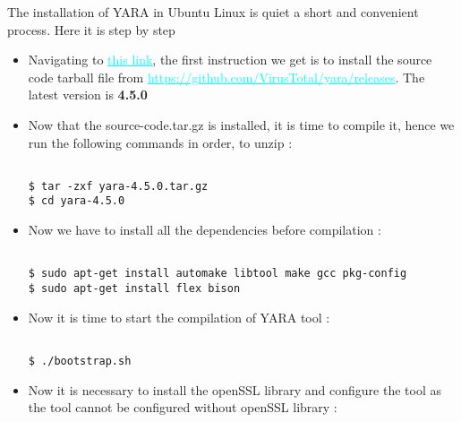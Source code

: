 

The installation of YARA in Ubuntu Linux is quiet a short and convenient process. Here it is step by step
\begin{itemize}

\item Navigating to \href{https://yara.readthedocs.io/en/stable/gettingstarted.html}{\textcolor{cyan}{\uline{this link}}}, the first instruction we get is to install the source code tarball file from \href{https://github.com/VirusTotal/yara/releases}{\textcolor{cyan}{\uline{https://github.com/VirusTotal/yara/releases}}}. The latest version is \textbf{4.5.0}

\item Now that the source-code.tar.gz is installed, it is time to compile it, hence we run the following commands in order, to unzip :

\begin{verbatim}

$ tar -zxf yara-4.5.0.tar.gz
$ cd yara-4.5.0

\end{verbatim}

\item Now we have to install all the dependencies before compilation :


\begin{verbatim}

$ sudo apt-get install automake libtool make gcc pkg-config
$ sudo apt-get install flex bison

\end{verbatim}

\item Now it is time to start the compilation of YARA tool :


\begin{verbatim}

$ ./bootstrap.sh

\end{verbatim}

\item Now it is necessary to install the openSSL library and configure the tool as the tool cannot be configured without openSSL library :


\begin{verbatim}


\end{verbatim}
\end{itemize}
